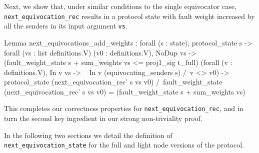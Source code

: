 \documentclass[runningheads]{llncs}
\begin{document}
Next, we show that, under similar conditions to the single equivocator case, \verb|next_equivocation_rec| results in a protocol state with fault weight increased by all the senders in its input argument \verb|vs|.
\begin{coq}
Lemma next_equivocations_add_weights :
	forall (s : state),
	protocol_state s ->
	forall (vs : list definitions.V) (v0 : definitions.V),
	NoDup vs ->
	(fault_weight_state s + sum_weights vs <= proj1_sig t_full)%
	(forall (v : definitions.V),
	In v vs -> ~ In v (equivocating_senders s) /\ v <> v0) ->
	protocol_state (next_equivocation_rec' s vs v0) /\
	fault_weight_state (next_equivocation_rec' s vs v0) =
	(fault_weight_state s + sum_weights vs)%
\end{coq}
This completes our correctness properties for \verb|next_equivocation_rec|, and in turn the second key ingredient in our strong non-triviality proof.

In the following two sections we detail the definition of \verb|next_equivocation_state| for the full and light node versions of the protocol.
\end{document}
